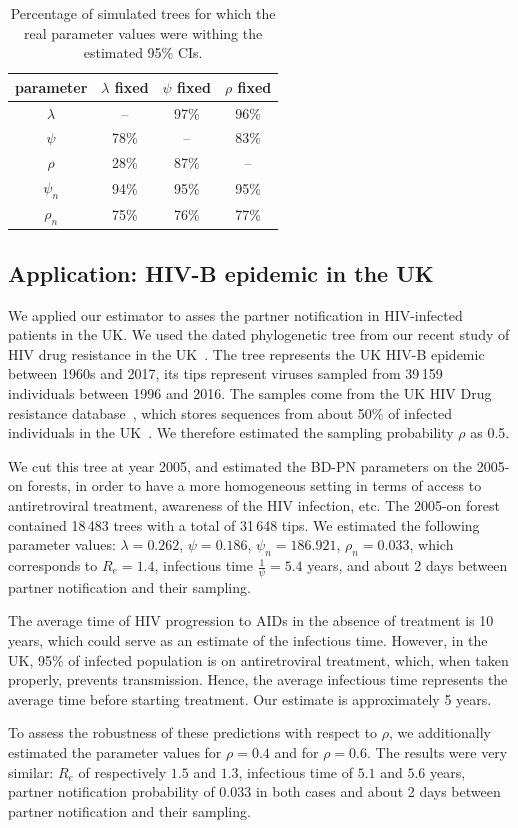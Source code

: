 \documentclass[a4paper,10pt]{article}
\begin{document}
 \begin{table}[!h]\centering
\small
\caption{Percentage of simulated trees for which the real parameter values were withing the estimated 95\% CIs. \smallskip}
\begin{tabular}{c|ccc}
\textbf{parameter} & \textbf{$\lambda$ fixed} & \textbf{$\psi$ fixed} & \textbf{$\rho$ fixed} \\
\toprule 
 $\lambda$ & -- &  97\% & 96\% \\
 $\psi$ & 78\% & -- & 83\% \\
 $\rho$ & 28\% & 87\%  & -- \\
 $\psi_n$ & 94\% & 95\% & 95\% \\
 $\rho_n$ & 75\% & 76\% & 77\% \\
\bottomrule
\end{tabular}
\label{tbl:ci}
\end{table}

\subsection{Application: HIV-B epidemic in the UK}
We applied our estimator to asses the partner notification in HIV-infected patients in the UK. We used the dated phylogenetic tree from our recent study of HIV drug resistance in the UK~\citep{zhukovaModelingDrugResistance2023}. The tree represents the UK HIV-B epidemic between 1960s and 2017, its tips represent viruses sampled from 39\,159 individuals between 1996 and 2016. The samples come from the UK HIV Drug resistance database~\citep{Dunn2007}, which stores sequences from about 50\% of infected individuals in the UK~\citep{zhukovaModelingDrugResistance2023}. We therefore estimated the sampling probability $\rho$ as 0.5.

We cut this tree at year 2005, and estimated the BD-PN parameters on the 2005-on forests, in order to have a more homogeneous setting in terms of access to antiretroviral treatment, awareness of the HIV infection, etc. The 2005-on forest contained 18\,483 trees with a total of 31\,648 tips. We estimated the following parameter values: $\lambda=0.262$, $\psi=0.186$, $\psi_n=186.921$, $\rho_n=0.033$, which corresponds to $R_e = 1.4$, infectious time $\frac{1}{\psi} = 5.4$ years, and about 2 days between partner notification and their sampling.
 
The average time of HIV progression to AIDs in the absence of treatment is 10 years, which could serve as an estimate of the infectious time. However, in the UK, 95\% of infected population is on antiretroviral treatment, which, when taken properly, prevents transmission. Hence, the average infectious time represents the average time before starting treatment. Our estimate is approximately 5 years. 

To assess the robustness of these predictions with respect to $\rho$, we additionally estimated the parameter values for $\rho=0.4$ and for $\rho=0.6$. The results were very similar: $R_e$ of respectively $1.5$ and 
$1.3$, infectious time of $5.1$ and $5.6$ years, partner notification probability of $0.033$ in both cases and about 2 days between partner notification and their sampling.
\end{document}
